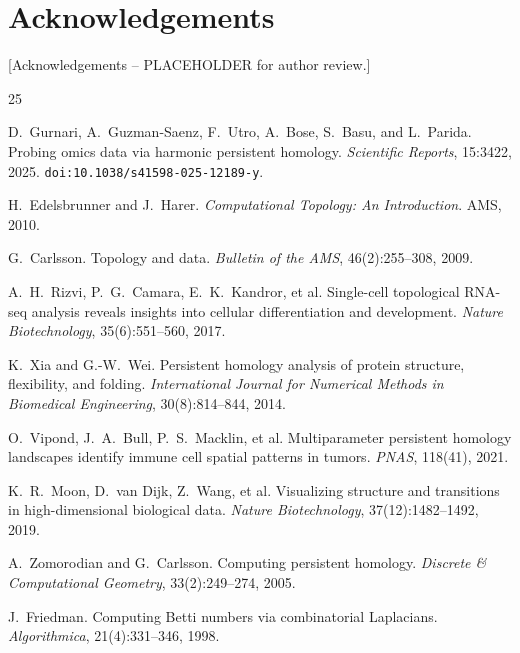 \documentclass[12pt]{article}
\begin{document}
\section*{Acknowledgements}
[Acknowledgements -- PLACEHOLDER for author review.]


\begin{thebibliography}{25}

D.~Gurnari, A.~Guzman-Saenz, F.~Utro, A.~Bose, S.~Basu, and L.~Parida.
Probing omics data via harmonic persistent homology.
\emph{Scientific Reports}, 15:3422, 2025.
\texttt{doi:10.1038/s41598-025-12189-y}.

H.~Edelsbrunner and J.~Harer.
\emph{Computational Topology: An Introduction}.
AMS, 2010.

G.~Carlsson.
Topology and data.
\emph{Bulletin of the AMS}, 46(2):255--308, 2009.

A.~H.~Rizvi, P.~G.~Camara, E.~K.~Kandror, et al.
Single-cell topological RNA-seq analysis reveals insights into cellular differentiation and development.
\emph{Nature Biotechnology}, 35(6):551--560, 2017.

K.~Xia and G.-W.~Wei.
Persistent homology analysis of protein structure, flexibility, and folding.
\emph{International Journal for Numerical Methods in Biomedical Engineering}, 30(8):814--844, 2014.

O.~Vipond, J.~A.~Bull, P.~S.~Macklin, et al.
Multiparameter persistent homology landscapes identify immune cell spatial patterns in tumors.
\emph{PNAS}, 118(41), 2021.

K.~R.~Moon, D.~van Dijk, Z.~Wang, et al.
Visualizing structure and transitions in high-dimensional biological data.
\emph{Nature Biotechnology}, 37(12):1482--1492, 2019.

A.~Zomorodian and G.~Carlsson.
Computing persistent homology.
\emph{Discrete \& Computational Geometry}, 33(2):249--274, 2005.

J.~Friedman.
Computing Betti numbers via combinatorial Laplacians.
\emph{Algorithmica}, 21(4):331--346, 1998.


\end{thebibliography}
\end{document}
